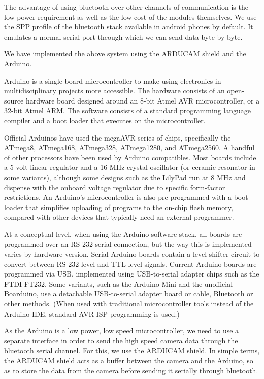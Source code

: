 \documentclass[11pt]{report}
\begin{document}
The advantage of using bluetooth over other channels of communication is the low power requirement as well as the low cost of the modules themselves. We use the SPP profile of the bluetooth stack available in android phones by default. It emulates a normal serial port theough which we can send data byte by byte. 

We have implemented  the above system using the ARDUCAM shield and the Arduino.

Arduino is a single-board microcontroller to make using electronics in multidisciplinary projects more accessible. The hardware consists of an open-source hardware board designed around an 8-bit Atmel AVR microcontroller, or a 32-bit Atmel ARM. The software consists of a standard programming language compiler and a boot loader that executes on the microcontroller. 

Official Arduinos have used the megaAVR series of chips, specifically the ATmega8, ATmega168, ATmega328, ATmega1280, and ATmega2560. A handful of other processors have been used by Arduino compatibles. Most boards include a 5 volt linear regulator and a 16 MHz crystal oscillator (or ceramic resonator in some variants), although some designs such as the LilyPad run at 8 MHz and dispense with the onboard voltage regulator due to specific form-factor restrictions. An Arduino's microcontroller is also pre-programmed with a boot loader that simplifies uploading of programs to the on-chip flash memory, compared with other devices that typically need an external programmer.

At a conceptual level, when using the Arduino software stack, all boards are programmed over an RS-232 serial connection, but the way this is implemented varies by hardware version. Serial Arduino boards contain a level shifter circuit to convert between RS-232-level and TTL-level signals. Current Arduino boards are programmed via USB, implemented using USB-to-serial adapter chips such as the FTDI FT232. Some variants, such as the Arduino Mini and the unofficial Boarduino, use a detachable USB-to-serial adapter board or cable, Bluetooth or other methods. (When used with traditional microcontroller tools instead of the Arduino IDE, standard AVR ISP programming is used.)

As the Arduino is a low power, low speed microcontroller, we need to use a separate interface in order to send the high speed camera data through the bluetooth serial channel. For this, we use the ARDUCAM shield. In simple terms, the ARDUCAM shield acts as a buffer between the camera and the Arduino, so as to store the data from the camera before sending it serially through bluetooth.
\end{document}
